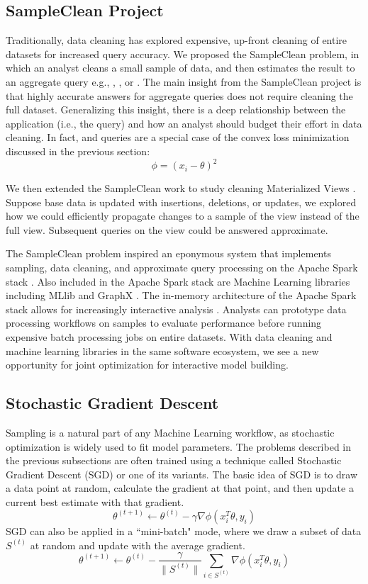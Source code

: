 \subsection{SampleClean Project}

Traditionally, data cleaning has explored expensive, up-front cleaning of entire datasets for increased query accuracy.
We proposed the SampleClean problem, in which an analyst cleans a small sample of data, and then estimates the result to an aggregate query e.g., \sumfunc, \countfunc, or \avgfunc.
The main insight from the SampleClean project is that highly accurate answers for aggregate queries does not require cleaning the full dataset.
Generalizing this insight, there is a deep relationship between the application (i.e., the query) and how an analyst should budget their effort in data cleaning.
In fact, \avgfunc and \sumfunc queries are a special case of the convex loss minimization discussed in the previous section:
\[
\phi = (x_{i} - \theta)^2
\]

We then extended the SampleClean work to study cleaning Materialized Views \cite{technicalReport}.
Suppose base data is updated with insertions, deletions, or updates, we explored how we could efficiently propagate
changes to a sample of the view instead of the full view.
Subsequent queries on the view could be answered approximate.

The SampleClean problem inspired an eponymous system that implements sampling, data cleaning, and approximate query processing on the Apache Spark stack \cite{sampleclean}.
Also included in the Apache Spark stack are Machine Learning libraries including MLlib \cite{mllib} and GraphX \cite{graphx}.
The in-memory architecture of the Apache Spark stack allows for increasingly interactive analysis \cite{AgarwalMPMMS13, armbrust2015spark}.
Analysts can prototype data processing workflows on samples to evaluate performance before running expensive batch processing jobs on entire datasets.
With data cleaning and machine learning libraries in the same software ecosystem, we see a new opportunity for joint optimization for interactive model building.



\subsection{Stochastic Gradient Descent}
Sampling is a natural part of any Machine Learning workflow, as stochastic optimization is widely used to fit model parameters.
The problems described in the previous subsections are often trained using a technique called Stochastic Gradient Descent (SGD) or one of its variants.
The basic idea of SGD is to draw a data point at random, calculate the gradient at that point, and then update a current best estimate with that gradient.
\[
\theta^{(t+1)}\leftarrow\theta^{(t)}-\gamma\nabla\phi(x_{i}^T\theta,y_{i})
\]
 SGD can also be applied in a ``mini-batch" mode, where we draw a subset of data $S^{(t)}$ at random and update with the average gradient.
 \[
 \theta^{(t+1)}\leftarrow\theta^{(t)}-\frac{\gamma}{\|S^{(t)}\|}\sum_{i\in S^{(t)}}\nabla\phi(x_{i}^T\theta,y_{i})
 \]


